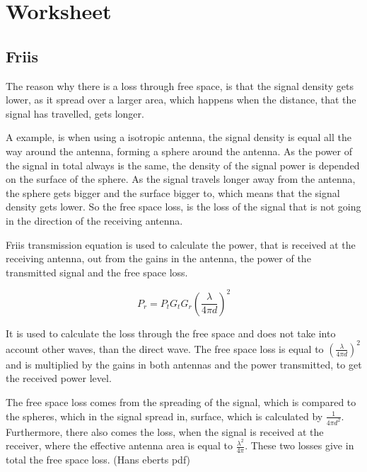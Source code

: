 \chapter{Worksheet}
\section{Friis}

The reason why there is a loss through free space, is that the signal density gets lower, as it spread over a larger area, which happens when the distance, that the signal has travelled, gets longer. 

A example, is when using a isotropic antenna, the signal density is equal all the way around the antenna, forming a sphere around the antenna. As the power of the signal in total always is the same, the density of the signal power is depended on the surface of the sphere. As the signal travels longer away from the antenna, the sphere gets bigger and the surface bigger to, which means that the signal density gets lower. So the free space loss, is the loss of the signal that is not going in the direction of the receiving antenna.


Friis transmission equation is used to calculate the power, that is received at the receiving antenna, out from the gains in the antenna, the power of the transmitted signal and the free space loss. 

\begin{equation}
P_r = P_t G_t G_r (\frac{\lambda}{4 \pi d})^2
\end{equation}
\begin{where}
\end{where}

It is used to calculate the loss through the free space and does not take into account other waves, than the direct wave. The free space loss is equal to $(\frac{\lambda}{4 \pi d})^2$ and is multiplied by the gains in both antennas and the power transmitted, to get the received power level.

The free space loss comes from the spreading of the signal, which is compared to the spheres, which in the signal spread in, surface, which is calculated by $\frac{1}{4 \pi d^2}$. Furthermore, there also comes the loss, when the signal is received at the receiver, where the effective antenna area is equal to $\frac{\lambda^2}{4 \pi}$. These two losses give in total the free space loss. (Hans eberts pdf)


